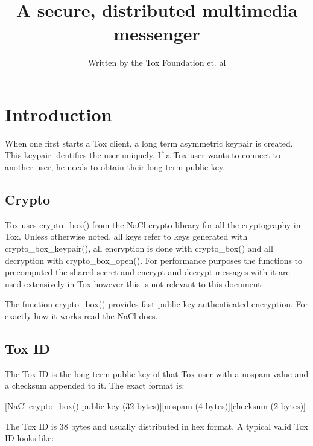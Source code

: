 \documentclass{tox}
\begin{document}
\title{A secure, distributed multimedia messenger}


\author{Written by the Tox Foundation et. al} %

\maketitle

\tableofcontents
\clearpage

\section{Introduction}

When one first starts a Tox client, a long term asymmetric keypair is created. 
This keypair identifies the user uniquely. If a Tox user wants to connect to 
another user, he needs to obtain their long term public key. 

\subsection{Crypto}

Tox uses crypto\_box() from the NaCl crypto library for all the cryptography in 
Tox. Unless otherwise noted, all keys refer to keys generated with 
crypto\_box\_keypair(), all encryption is done with crypto\_box() and all 
decryption with crypto\_box\_open(). For performance purposes the functions to 
precomputed the shared secret and encrypt and decrypt messages with it are used 
extensively in Tox however this is not relevant to this document.

The function crypto\_box() provides fast public-key authenticated encryption. 
For exactly how it works read the NaCl docs.

\subsection{Tox ID}

The Tox ID is the long term public key of that Tox user with a nospam value and 
a checksum appended to it. The exact format is:

[NaCl crypto\_box() public key (32 bytes)][nospam (4 bytes)][checksum (2 bytes)]

The Tox ID is 38 bytes and usually distributed in hex format. A typical valid 
Tox ID looks like:
\end{document}
